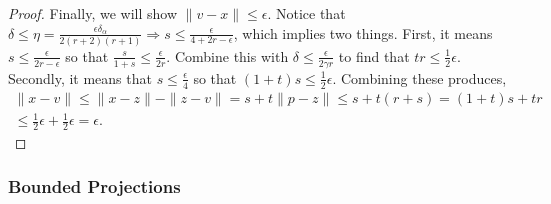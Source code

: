 \begin{proof}
Finally, we will show $\|v - x\| \le \epsilon$.
Notice that $\delta \le \eta = \frac{\epsilon\delta_{\alpha}}{2(r+2)(r + 1)} \Longrightarrow s \le \frac{\epsilon}{4 + 2r - \epsilon}$, which implies two things.
First, it means $s \le \frac{\epsilon}{2r - \epsilon}$ so that
$\frac {s}{1 + s} \le \frac {\epsilon} {2r}. $
Combine this with $\delta \le \frac {\epsilon} {2\gamma r}$ to find that $tr \le \frac 1 2 \epsilon$.
Secondly, it means that
$s \le \frac{\epsilon}{4}$ so that $(1 + t)s \le \frac 1 2 \epsilon$.
Combining these produces,
\begin{align*}
\|x - v\| 
\le \|x - z\| - \|z - v\| 
= s + t \|p - z\| 
\le s + t \left(r + s\right) 
= (1 + t)s + tr \\
\le \frac 1 2 \epsilon + \frac 1 2 \epsilon = \epsilon.
\end{align*}

\end{proof}

\subsubsection{Bounded Projections}
\label{simplifed_bounded_projection}




